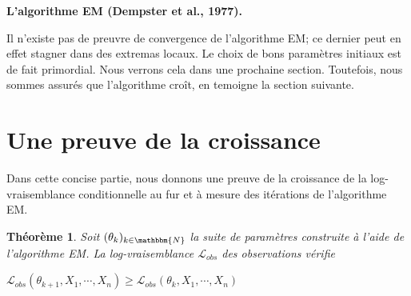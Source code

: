 \documentclass[frenchb]{report}
\newcommand{\N}{\mathbbm{N}}
\newcommand{\1}{\mathbbm{1}}
\newcommand{\lv}{\mathcal{L}}
\newtheorem{thm}{Théorème}
\theoremstyle{definition}\newtheorem{defn}{Définition}
\theoremstyle{definition}\newtheorem{exm}{Exemple}
\theoremstyle{definition}\newtheorem{nota}{Notation}
\theoremstyle{definition}\newtheorem{rem}{Remarque}
\begin{document}
\begin{algorithm}
	\caption{\textbf{L’algorithme EM (Dempster et al., 1977).}}
	\begin{algorithmic}[1]
		\ENSURE
		\ENDWHILE
	\end{algorithmic}
\end{algorithm}

Il n'existe pas de preuvre de convergence de l'algorithme EM; ce dernier peut en effet stagner dans des extremas locaux. Le choix de bons paramètres initiaux est de fait primordial. Nous verrons cela dans une prochaine section. Toutefois, nous sommes assurés que l'algorithme croît, en temoigne la section suivante.

\newpage
\section{Une preuve de la croissance}

Dans cette concise partie, nous donnons une preuve de la croissance de la log-vraisemblance conditionnelle au fur et à mesure des itérations de l'algorithme EM.

\begin{thm}
Soit $(\theta_k)_{k\in \N}$ la suite de paramètres construite à l'aide de l'algorithme EM. La log-vraisemblance $\lv_{obs}$ des observations vérifie 
\begin{center} $\lv_{obs}(\theta_{k+1}, X_1, \cdots, X_n) \geq \lv_{obs}(\theta_k, X_1, \cdots, X_n)$ \end{center}
\end{thm}
\end{document}
